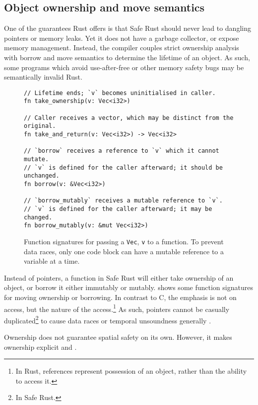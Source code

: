 \documentclass[dissertation.tex]{subfiles}
\begin{document}
\subsection{Object ownership and move semantics}
\label{sec:rust-borrow}


One of the guarantees Rust offers is that Safe Rust should never lead to
dangling pointers or memory leaks.
Yet it does not have a garbage collector, or expose memory management.
Instead, the compiler couples strict ownership analysis with borrow and
move semantics to determine the lifetime of an object.
As such, some programs which avoid use-after-free or other memory safety
bugs may be semantically invalid Rust.

\begin{figure}[ht]
\begin{lstlisting}
// Lifetime ends; `v` becomes uninitialised in caller.
fn take_ownership(v: Vec<i32>)

// Caller receives a vector, which may be distinct from the original.
fn take_and_return(v: Vec<i32>) -> Vec<i32>

// `borrow` receives a reference to `v` which it cannot mutate.
// `v` is defined for the caller afterward; it should be unchanged.
fn borrow(v: &Vec<i32>)

// `borrow_mutably` receives a mutable reference to `v`.
// `v` is defined for the caller afterward; it may be changed.
fn borrow_mutably(v: &mut Vec<i32>)
\end{lstlisting}
\caption{ Function signatures for passing a
\texttt{Vec}, \texttt{v} to a function. To prevent data races, only one
code block can have a mutable reference to a variable at a time.}
\label{lst:rust-ownership}
\end{figure}

Instead of pointers, a function in Safe Rust will either take ownership
of an object, or borrow it either immutably or mutably.
 shows some function signatures for
moving ownership or borrowing.
In contrast to C, the emphasis is not on access, but the nature of the
access.\footnote{In Rust, references represent possession of an object,
rather than the ability to access it.}
As such, pointers cannot be casually duplicated\footnote{In Safe Rust.}
to cause data races or temporal unsoundness generally .

Ownership does not guarantee spatial safety on its own.
However, it makes ownership explicit and .
\end{document}
